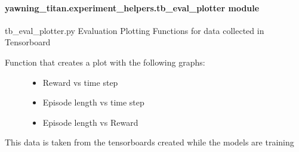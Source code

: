 \documentclass[letterpaper,10pt,english]{sphinxmanual}
\begin{document}
\paragraph{yawning\_titan.experiment\_helpers.tb\_eval\_plotter module}
\label{\detokenize{source/yawning_titan.experiment_helpers:module-yawning_titan.experiment_helpers.tb_eval_plotter}}\label{\detokenize{source/yawning_titan.experiment_helpers:yawning-titan-experiment-helpers-tb-eval-plotter-module}}
\sphinxAtStartPar
tb\_eval\_plotter.py \sphinxhyphen{} Evaluation Plotting Functions for data collected in Tensorboard

\begin{fulllineitems}
\label{\detokenize{source/yawning_titan.experiment_helpers:yawning_titan.experiment_helpers.tb_eval_plotter.show_training_data}}\begin{description}
\item[{Function that creates a plot with the following graphs:}] \leavevmode\begin{itemize}
\item {}
\sphinxAtStartPar
Reward vs time step

\item {}
\sphinxAtStartPar
Episode length vs time step

\item {}
\sphinxAtStartPar
Episode length vs Reward

\end{itemize}

\end{description}

\sphinxAtStartPar
This data is taken from the tensorboards created while the models are training

\end{fulllineitems}
\end{document}
